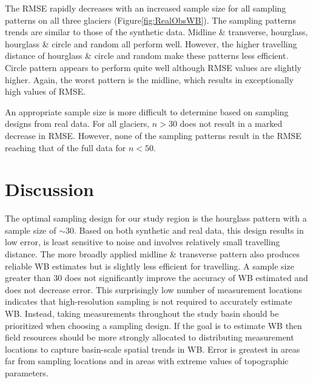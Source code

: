 \documentclass[twocolumn,letterpaper]{igs}
\begin{document}
The RMSE rapidly decreases with an increased sample size for all sampling patterns on all three glaciers (Figure\ref{fig:RealObsWB}).  The sampling patterns trends are similar to those of the synthetic data. Midline \& transverse, hourglass, hourglass \& circle and random all perform well. However, the higher travelling distance of hourglass \& circle and random make these patterns less efficient. Circle pattern appears to perform quite well although RMSE values are slightly higher. Again, the worst pattern is the midline, which results in exceptionally high values of RMSE. 

An appropriate sample size is more difficult to determine based on sampling designs from real data. For all glaciers, $n>30$ does not result in a marked decrease in RMSE. However, none of the sampling patterns result in the RMSE reaching that of the full data for $n<50$. 

\section{Discussion}

The optimal sampling design for our study region is the hourglass pattern with a sample size of $\sim30$. Based on both synthetic and real data, this design results in low error, is least sensitive to noise and involves relatively small travelling distance. The more broadly applied midline \& transverse pattern also produces reliable WB estimates but is slightly less efficient for travelling. A sample size greater than 30 does not significantly improve the accuracy of WB estimated and does not decrease error. This surprisingly low number of measurement locations indicates that high-resolution sampling is not required to accurately estimate WB. Instead, taking measurements throughout the study basin should be prioritized when choosing a sampling design. If the goal is to estimate WB then field resources should be more strongly allocated to distributing measurement locations to capture basin-scale spatial trends in WB. Error is greatest in areas far from sampling locations and in areas with extreme values of topographic parameters. 
\end{document}
